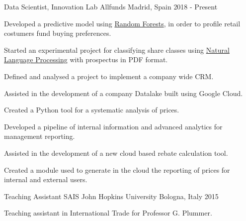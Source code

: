

\begin{cventries}

\cventry
    {Data Scientist, Innovation Lab} %
    {Allfunds} %
    {Madrid, Spain} %
    {2018 - Present} %
    {
        \begin{cvitems} %
            \item {Developed a predictive model using \href{https://en.wikipedia.org/wiki/Random_forest}{Random Forests}, in order to profile retail costumers fund buying preferences.}
            \item {Started an experimental project for classifying share classes using \href{https://en.wikipedia.org/wiki/Natural_language_processing}{Natural Language Processing} with prospectus in PDF format.}
            \item {Defined and analysed a project to implement a company wide CRM.}
            \item {Assisted in the development of a company Datalake built using Google Cloud.}
            \item {Created a Python tool for a systematic analysis of prices.}
            \item {Developed a pipeline of internal information and advanced analytics for management reporting.}
            \item {Assisted in the development of a new cloud based rebate calculation tool.}
            \item {Created a module used to generate in the cloud the reporting of prices for internal and external users.}
        \end{cvitems}
    }

\cventry
    {Teaching Assistant} %
    {SAIS John Hopkins University} %
    {Bologna, Italy} %
    {2015} %
    {
        \begin{cvitems} %
            \item {Teaching assistant in International Trade for Professor G. Plummer.}
        \end{cvitems}
    }


\end{cventries}
